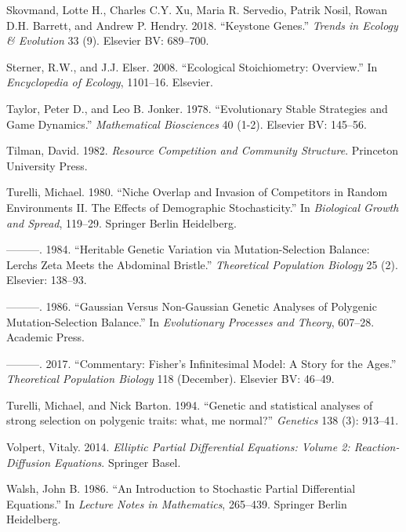 \documentclass[]{article}
\begin{document}
\leavevmode\hypertarget{ref-Skovmand2018}{}%
Skovmand, Lotte H., Charles C.Y. Xu, Maria R. Servedio, Patrik Nosil,
Rowan D.H. Barrett, and Andrew P. Hendry. 2018. ``Keystone Genes.''
\emph{Trends in Ecology \& Evolution} 33 (9). Elsevier BV: 689--700.

\leavevmode\hypertarget{ref-Sterner2008}{}%
Sterner, R.W., and J.J. Elser. 2008. ``Ecological Stoichiometry:
Overview.'' In \emph{Encyclopedia of Ecology}, 1101--16. Elsevier.

\leavevmode\hypertarget{ref-Taylor1978}{}%
Taylor, Peter D., and Leo B. Jonker. 1978. ``Evolutionary Stable
Strategies and Game Dynamics.'' \emph{Mathematical Biosciences} 40
(1-2). Elsevier BV: 145--56.

\leavevmode\hypertarget{ref-davidtilman1982}{}%
Tilman, David. 1982. \emph{Resource Competition and Community
Structure}. Princeton University Press.

\leavevmode\hypertarget{ref-Turelli1980}{}%
Turelli, Michael. 1980. ``Niche Overlap and Invasion of Competitors in
Random Environments II. The Effects of Demographic Stochasticity.'' In
\emph{Biological Growth and Spread}, 119--29. Springer Berlin
Heidelberg.

\leavevmode\hypertarget{ref-Turelli1984}{}%
---------. 1984. ``Heritable Genetic Variation via Mutation-Selection
Balance: Lerchs Zeta Meets the Abdominal Bristle.'' \emph{Theoretical
Population Biology} 25 (2). Elsevier: 138--93.

\leavevmode\hypertarget{ref-Turelli1986}{}%
---------. 1986. ``Gaussian Versus Non-Gaussian Genetic Analyses of
Polygenic Mutation-Selection Balance.'' In \emph{Evolutionary Processes
and Theory}, 607--28. Academic Press.

\leavevmode\hypertarget{ref-Turelli2017}{}%
---------. 2017. ``Commentary: Fisher's Infinitesimal Model: A Story for
the Ages.'' \emph{Theoretical Population Biology} 118 (December).
Elsevier BV: 46--49.

\leavevmode\hypertarget{ref-pmid7851785}{}%
Turelli, Michael, and Nick Barton. 1994. ``Genetic and statistical
analyses of strong selection on polygenic traits: what, me normal?''
\emph{Genetics} 138 (3): 913--41.

\leavevmode\hypertarget{ref-Volpert2014}{}%
Volpert, Vitaly. 2014. \emph{Elliptic Partial Differential Equations:
Volume 2: Reaction-Diffusion Equations}. Springer Basel.

\leavevmode\hypertarget{ref-Walsh}{}%
Walsh, John B. 1986. ``An Introduction to Stochastic Partial
Differential Equations.'' In \emph{Lecture Notes in Mathematics},
265--439. Springer Berlin Heidelberg.
\end{document}
